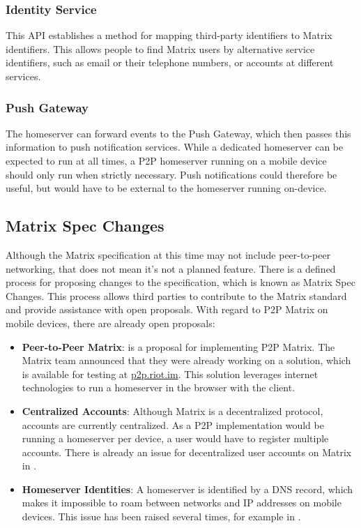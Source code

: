 \subsubsection{Identity Service}
This \ac{API} establishes a method for mapping third-party identifiers to Matrix identifiers.
This allows people to find Matrix users by alternative service identifiers, such as email or their telephone numbers, or accounts at different services.

\subsubsection{Push Gateway}
The homeserver can forward events to the Push Gateway, which then passes this information to push notification services.
While a dedicated homeserver can be expected to run at all times, a \ac{P2P} homeserver running on a mobile device should only run when strictly necessary.
Push notifications could therefore be useful, but would have to be external to the homeserver running on-device.


\subsection{Matrix Spec Changes}
Although the Matrix specification at this time may not include peer-to-peer networking, that does not mean it's not a planned feature.
There is a defined process for proposing changes to the specification, which is known as Matrix Spec Changes\cite{matrix_org_spec_changes}.
This process allows third parties to contribute to the Matrix standard and provide assistance with open proposals.
With regard to \ac{P2P} Matrix on mobile devices, there are already open proposals:
\begin{itemize}
	\item{
	      \textbf{Peer-to-Peer Matrix}:
	       is a proposal for implementing \ac{P2P} Matrix.
	      The Matrix team announced that they were already working on a solution, which is available for testing at \url{p2p.riot.im}.
	      This solution leverages internet technologies to run a homeserver in the browser with the client.
	      }
	\item{
	      \textbf{Centralized Accounts}:
	      Although Matrix is a decentralized protocol, accounts are currently centralized.
	      As a \ac{P2P} implementation would be running a homeserver per device, a user would have to register multiple accounts.
	      There is already an issue for decentralized user accounts on Matrix in .
	      }
	\item{
	      \textbf{Homeserver Identities}:
	      A homeserver is identified by a DNS record, which makes it impossible to roam between networks and IP addresses on mobile devices.
	      This issue has been raised several times, for example in .
	      }
\end{itemize}


